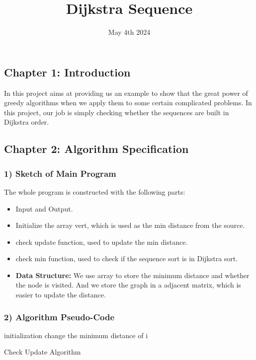 \documentclass{article}
\title{\bf Dijkstra Sequence}
\author{}
\date{May 4th 2024}
\begin{document}
\maketitle
\newpage

\subsection*{\bf Chapter 1: Introduction}
In this project aims at providing us an example to show that the great power of greedy algorithms when we apply them to some certain complicated problems. In this project, our job is simply checking whether the sequences are built in Dijkstra order.

\subsection*{\bf Chapter 2: Algorithm Specification}

\subsubsection*{\bf 1) Sketch of Main Program}

The whole program is constructed with the following parts:
\begin{itemize}
\item Input and Output.
\item Initialize the array vert, which is used as the min distance from the source.
\item check update function, used to update the min distance.
\item check min function, used to check if the sequence sort is in Dijkstra sort.
\item {\bf Data Structure:} We use array to store the minimum distance and whether the node is visited. And we store the graph in a adjacent matrix, which is easier to update the distance.
\end{itemize}

\subsubsection*{2) Algorithm Pseudo-Code}
\begin{algorithm}[H]
    \SetAlgoLined

    initialization\;
    {
        {
            {
                change the minimum distance of i
            }
        }
    }
    \caption{Check Update Algorithm}
\end{algorithm}
\end{document}
